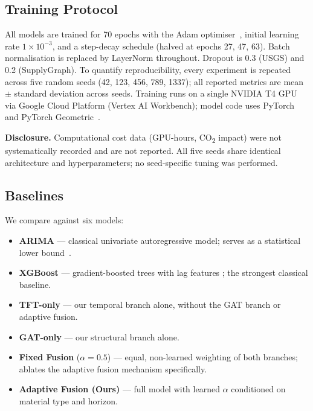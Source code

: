 \subsection{Training Protocol}

All models are trained for 70 epochs with the Adam
optimiser~\cite{kingma2015adam}, initial learning
rate $1{\times}10^{-3}$, and a step-decay schedule (halved at
epochs 27, 47, 63). Batch normalisation is replaced by LayerNorm
throughout. Dropout is 0.3 (USGS) and 0.2 (SupplyGraph).
To quantify reproducibility, every experiment is repeated across
five random seeds (42, 123, 456, 789, 1337); all reported metrics
are mean $\pm$ standard deviation across seeds. Training runs on
a single NVIDIA T4 GPU via Google Cloud Platform (Vertex AI
Workbench); model code uses PyTorch~\cite{paszke2019pytorch} and
PyTorch Geometric~\cite{fey2019pyg}.

\smallskip
\noindent\textbf{Disclosure.} Computational cost data (GPU-hours,
CO\textsubscript{2} impact) were not systematically recorded and
are not reported. All five seeds share identical architecture and
hyperparameters; no seed-specific tuning was performed.

\subsection{Baselines}

We compare against six models:

\begin{itemize}[leftmargin=*, nosep]
  \item \textbf{ARIMA} --- classical univariate autoregressive model;
    serves as a statistical lower bound~\cite{hyndman2018fpp}.
  \item \textbf{XGBoost} — gradient-boosted trees with lag features
    \cite{chen2016xgboost}; the strongest classical baseline.
  \item \textbf{TFT-only} — our temporal branch alone, without the
    GAT branch or adaptive fusion.
  \item \textbf{GAT-only} — our structural branch alone.
  \item \textbf{Fixed Fusion} ($\alpha{=}0.5$) — equal, non-learned
    weighting of both branches; ablates the adaptive fusion
    mechanism specifically.
  \item \textbf{Adaptive Fusion (Ours)} — full model with learned
    $\alpha$ conditioned on material type and horizon.
\end{itemize}

